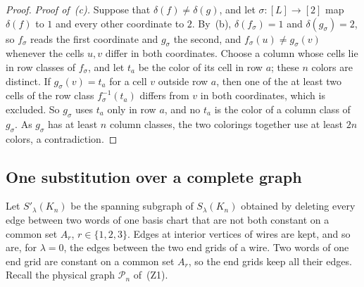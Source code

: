 \begin{proof}
\emph{Proof of~\textup{(c)}.} Suppose that $\delta(f)\ne\delta(g)$, and let $\sigma:[L]\to[2]$ map $\delta(f)$ to $1$ and every other coordinate to $2$. By~(b), $\delta(f_\sigma)=1$ and $\delta(g_\sigma)=2$, so $f_\sigma$ reads the first coordinate and $g_\sigma$ the second, and $f_\sigma(u)\ne g_\sigma(v)$ whenever the cells $u,v$ differ in both coordinates. Choose a column whose cells lie in row classes of $f_\sigma$, and let $t_a$ be the color of its cell in row $a$; these $n$ colors are distinct. If $g_\sigma(v)=t_a$ for a cell $v$ outside row $a$, then one of the at least two cells of the row class $f_\sigma^{-1}(t_a)$ differs from $v$ in both coordinates, which is excluded. So $g_\sigma$ uses $t_a$ only in row $a$, and no $t_a$ is the color of a column class of $g_\sigma$. As $g_\sigma$ has at least $n$ column classes, the two colorings together use at least $2n$ colors, a contradiction.
\end{proof}

\subsection{One substitution over a complete graph}\label{sec:kn-one}

Let $S'_\lambda(K_n)$ be the spanning subgraph of $S_\lambda(K_n)$ obtained by deleting every edge between two words of one basis chart that are not both constant on a common set $A_r$, $r\in\{1,2,3\}$. Edges at interior vertices of wires are kept, and so are, for $\lambda=0$, the edges between the two end grids of a wire. Two words of one end grid are constant on a common set $A_r$, so the end grids keep all their edges. Recall the physical graph $\mathcal P_n$ of~(Z1).

